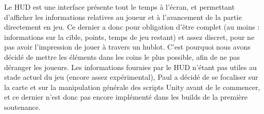 \documentclass[../doc.tex]{subfiles}
\begin{document}
Le HUD est une interface présente tout le temps à l'écran, et permettant d'afficher 
les informations relatives au joueur et à l'avancement de la partie directement en jeu. 
Ce dernier a donc pour obligation d'être complet (au moins : informations sur la cible,
points, temps de jeu restant) et assez discret, pour ne pas avoir l'impression 
de jouer à travers un hublot. C'est pourquoi nous avons décidé de mettre les 
éléments dans les coins le plus possible, afin de ne pas déranger les joueurs.
Les informations fournies par le HUD n'étant pas utiles au stade actuel du jeu 
(encore assez expérimental), Paul a décidé de se focaliser sur la carte et sur la manipulation
générale des scripts Unity avant de le commencer, et ce dernier n'est donc pas 
encore implémenté dans les builds de la première soutenance.
\end{document}
